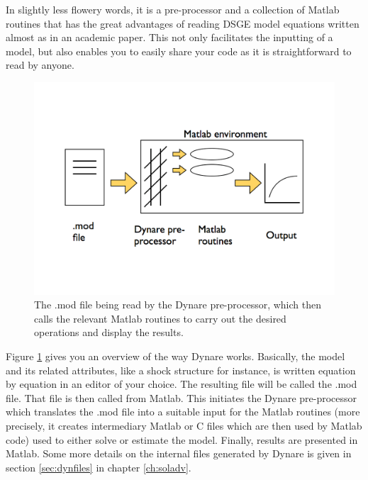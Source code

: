 In slightly less flowery words, it is a pre-processor and a collection of Matlab routines that has the great advantages of reading DSGE model equations written almost as in an academic paper. This not only facilitates the inputting of a model, but also enables you to easily share your code as it is straightforward to read by anyone.\\
\begin{figure} \label{fig:dyn}
\begin{center} 
\includegraphics[width=1.0\textwidth]{P_DynareStruct2} 
\end{center} 
\caption[Dynare, a bird's eyeview]{The .mod file being read by the Dynare pre-processor, which then calls the relevant Matlab routines to carry out the desired operations and display the results.} 
\end{figure}

Figure \ref{fig:dyn} gives you an overview of the way Dynare works. Basically, the model and its related attributes, like a shock structure for instance, is written equation by equation in an editor of your choice. The resulting file will be called the .mod file. That file is then called from Matlab. This initiates the Dynare pre-processor which translates the .mod file into a suitable input for the Matlab routines (more precisely, it creates intermediary Matlab or C files which are then used by Matlab code) used to either solve or estimate the model. Finally, results are presented in Matlab. Some more details on the internal files generated by Dynare is given in section \ref{sec:dynfiles} in chapter \ref{ch:soladv}. \\

